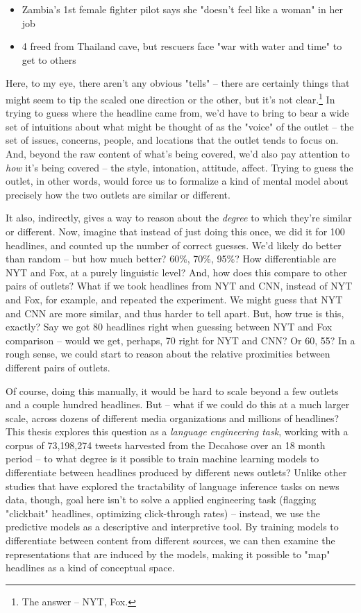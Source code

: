 \documentclass{scrartcl}
\begin{document}
\begin{itemize}
  \item Zambia's 1st female fighter pilot says she "doesn't feel like a woman" in her job
  \item 4 freed from Thailand cave, but rescuers face "war with water and time" to get to others
\end{itemize}

Here, to my eye, there aren't any obvious "tells" -- there are certainly things that might seem to tip the scaled one direction or the other, but it's not clear.\footnote{The answer -- NYT, Fox.} In trying to guess where the headline came from, we'd have to bring to bear a wide set of intuitions about what might be thought of as the "voice" of the outlet -- the set of issues, concerns, people, and locations that the outlet tends to focus on. And, beyond the raw content of what's being covered, we'd also pay attention to \textit{how} it's being covered -- the style, intonation, attitude, affect. Trying to guess the outlet, in other words, would force us to formalize a kind of mental model about precisely how the two outlets are similar or different.

It also, indirectly, gives a way to reason about the \textit{degree} to which they're similar or different. Now, imagine that instead of just doing this once, we did it for 100 headlines, and counted up the number of correct guesses. We'd likely do better than random -- but how much better? 60\%, 70\%, 95\%? How differentiable are NYT and Fox, at a purely linguistic level? And, how does this compare to other pairs of outlets? What if we took headlines from NYT and CNN, instead of NYT and Fox, for example, and repeated the experiment. We might guess that NYT and CNN are more similar, and thus harder to tell apart. But, how true is this, exactly? Say we got 80 headlines right when guessing between NYT and Fox comparison -- would we get, perhaps, 70 right for NYT and CNN? Or 60, 55? In a rough sense, we could start to reason about the relative proximities between different pairs of outlets.

Of course, doing this manually, it would be hard to scale beyond a few outlets and a couple hundred headlines. But -- what if we could do this at a much larger scale, across dozens of different media organizations and millions of headlines? This thesis explores this question as a \textit{language engineering task}, working with a corpus of 73,198,274 tweets harvested from the Decahose over an 18 month period -- to what degree is it possible to train machine learning models to differentiate between headlines produced by different news outlets? Unlike other studies that have explored the tractability of language inference tasks on news data, though, goal here isn't to solve a applied engineering task (flagging "clickbait" headlines, optimizing click-through rates) -- instead, we use the predictive models as a descriptive and interpretive tool. By training models to differentiate between content from different sources, we can then examine the representations that are induced by the models, making it possible to "map" headlines as a kind of conceptual space.
\end{document}
